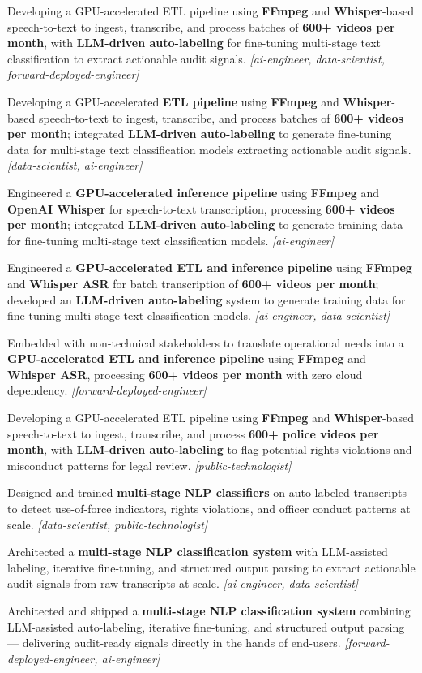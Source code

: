 \documentclass[letterpaper,11pt]{article}
\newcommand{\resumeItem}[1]{
  \item\small{
    {#1 \vspace{-3pt}}
  }
}
\begin{document}
                \resumeItem{Developing a GPU-accelerated ETL pipeline using \textbf{FFmpeg} and \textbf{Whisper}-based speech-to-text to ingest, transcribe, and process batches of \textbf{600+ videos per month}, with \textbf{LLM-driven auto-labeling} for fine-tuning multi-stage text classification to extract actionable audit signals. \textit{[ai-engineer, data-scientist, forward-deployed-engineer]}}
                \resumeItem{Developing a GPU-accelerated \textbf{ETL pipeline} using \textbf{FFmpeg} and \textbf{Whisper}-based speech-to-text to ingest, transcribe, and process batches of \textbf{600+ videos per month}; integrated \textbf{LLM-driven auto-labeling} to generate fine-tuning data for multi-stage text classification models extracting actionable audit signals. \textit{[data-scientist, ai-engineer]}}
                \resumeItem{Engineered a \textbf{GPU-accelerated inference pipeline} using \textbf{FFmpeg} and \textbf{OpenAI Whisper} for speech-to-text transcription, processing \textbf{600+ videos per month}; integrated \textbf{LLM-driven auto-labeling} to generate training data for fine-tuning multi-stage text classification models. \textit{[ai-engineer]}}
                \resumeItem{Engineered a \textbf{GPU-accelerated ETL and inference pipeline} using \textbf{FFmpeg} and \textbf{Whisper ASR} for batch transcription of \textbf{600+ videos per month}; developed an \textbf{LLM-driven auto-labeling} system to generate training data for fine-tuning multi-stage text classification models. \textit{[ai-engineer, data-scientist]}}
                \resumeItem{Embedded with non-technical stakeholders to translate operational needs into a \textbf{GPU-accelerated ETL and inference pipeline} using \textbf{FFmpeg} and \textbf{Whisper ASR}, processing \textbf{600+ videos per month} with zero cloud dependency. \textit{[forward-deployed-engineer]}}
                \resumeItem{Developing a GPU-accelerated ETL pipeline using \textbf{FFmpeg} and \textbf{Whisper}-based speech-to-text to ingest, transcribe, and process \textbf{600+ police videos per month}, with \textbf{LLM-driven auto-labeling} to flag potential rights violations and misconduct patterns for legal review. \textit{[public-technologist]}}

                \resumeItem{Designed and trained \textbf{multi-stage NLP classifiers} on auto-labeled transcripts to detect use-of-force indicators, rights violations, and officer conduct patterns at scale. \textit{[data-scientist, public-technologist]}}
                \resumeItem{Architected a \textbf{multi-stage NLP classification system} with LLM-assisted labeling, iterative fine-tuning, and structured output parsing to extract actionable audit signals from raw transcripts at scale. \textit{[ai-engineer, data-scientist]}}
                \resumeItem{Architected and shipped a \textbf{multi-stage NLP classification system} combining LLM-assisted auto-labeling, iterative fine-tuning, and structured output parsing --- delivering audit-ready signals directly in the hands of end-users. \textit{[forward-deployed-engineer, ai-engineer]}}
\end{document}
